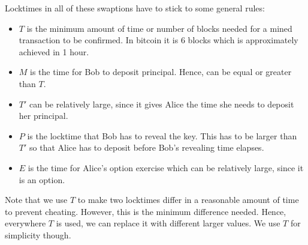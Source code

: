 Locktimes in all of these swaptions have to stick to some general rules: 
\begin{itemize}
    \item $T$ is the minimum amount of time or number of blocks needed for a mined transaction to be confirmed. In bitcoin it is $6$ blocks which is approximately achieved in 1 hour.
    
    \item $M$ is the time for Bob to deposit principal. Hence, can be equal or greater than $T$.
    
    \item $T'$ can be relatively large, since it gives Alice the time she needs to deposit her principal.
    
    \item $P$ is the locktime that Bob has to reveal the \keyone key. This has to be larger than $T'$ so that Alice has to deposit before Bob's revealing time elapses.
    
    \item $E$ is the time for Alice's option exercise which can be relatively large, since it is an option.
\end{itemize}
Note that we use $T$ to make two locktimes differ in a reasonable amount of time to prevent cheating. However, this is the minimum difference needed. Hence, everywhere $T$ is used, we can replace it with different larger values. We use $T$ for simplicity though.
